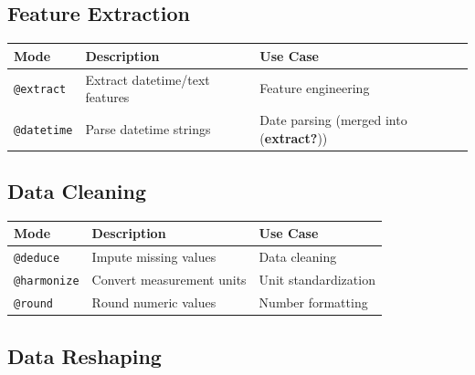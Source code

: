 \documentclass[
  letterpaper,
]{scrbook}
\begin{document}
\subsection{Feature Extraction}\label{feature-extraction}

\begin{longtable}[]{@{}
  >{\raggedright\arraybackslash}p{}
  >{\raggedright\arraybackslash}p{}
  >{\raggedright\arraybackslash}p{}@{}}
\toprule\noalign{}
\begin{minipage}[b]{\linewidth}\raggedright
Mode
\end{minipage} & \begin{minipage}[b]{\linewidth}\raggedright
Description
\end{minipage} & \begin{minipage}[b]{\linewidth}\raggedright
Use Case
\end{minipage} \\
\midrule\noalign{}
\endhead
\bottomrule\noalign{}
\endlastfoot
\texttt{@extract} & Extract datetime/text features & Feature
engineering \\
\texttt{@datetime} & Parse datetime strings & Date parsing (merged into
(\textbf{extract?})) \\
\end{longtable}

\subsection{Data Cleaning}\label{data-cleaning}

\begin{longtable}[]{@{}lll@{}}
\toprule\noalign{}
Mode & Description & Use Case \\
\midrule\noalign{}
\endhead
\bottomrule\noalign{}
\endlastfoot
\texttt{@deduce} & Impute missing values & Data cleaning \\
\texttt{@harmonize} & Convert measurement units & Unit
standardization \\
\texttt{@round} & Round numeric values & Number formatting \\
\end{longtable}

\subsection{Data Reshaping}\label{data-reshaping}
\end{document}
